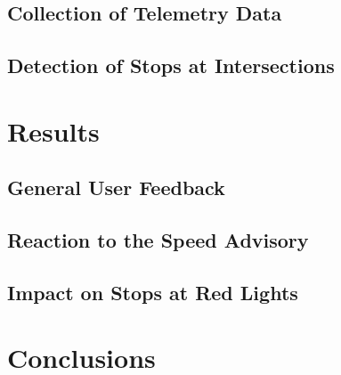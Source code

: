 \subsection{Collection of Telemetry Data}

\subsection{Detection of Stops at Intersections}

\section{Results}

\subsection{General User Feedback}

\subsection{Reaction to the Speed Advisory}

\subsection{Impact on Stops at Red Lights}

\section{Conclusions}
